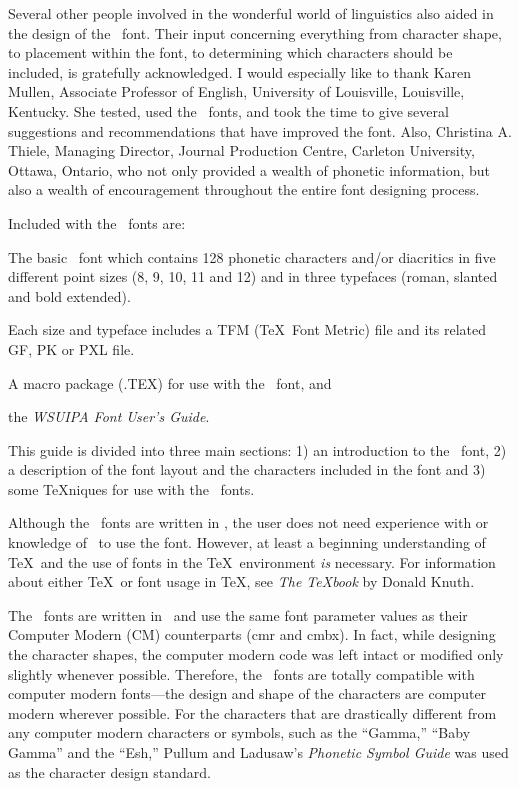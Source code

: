 Several other people involved
in the wonderful world of linguistics also aided in the design of the \wsu\
font. Their input concerning everything
from character shape, to placement within the font, to determining which
characters should be included, is gratefully acknowledged. I would especially
like to thank Karen Mullen, Associate Professor of English, University of
Louisville, Louisville, Kentucky.  She tested, used the \wsu\ fonts, and took
the time to give several suggestions and recommendations that have improved
the font. Also, Christina A. Thiele, Managing Director, Journal Production
 Centre,
Carleton University, Ottawa, Ontario, who not only provided a wealth
of phonetic information, but also a wealth of encouragement throughout
the entire font designing process.
 
 
Included with the \wsu\ fonts are:
 
\listbegin
{}
The basic \wsu\ font which contains 128 phonetic characters
and/or diacritics in five different point sizes (8,
9, 10, 11 and 12) and in
three typefaces (roman, slanted and bold extended).
 
 Each size and typeface includes a TFM (\TeX\ Font Metric)
file and its related GF, PK or PXL file.
 
 A macro package (\ipam.TEX) for use with the \wsu\ font, and
 
 the {\it WSUIPA Font User's Guide}.
\listend
 
This guide is divided into three main sections: 1) an introduction to the \wsu\
font,
2) a description of the font layout and the characters included in the font
and 3) some \TeX niques for use with the \wsu\  fonts.
 
Although the \wsu\ fonts are written in \meta , the user does not need
experience with or knowledge of \meta\ to use the font. However, at least a
beginning understanding of \TeX\ and the use of fonts in the \TeX\ environment
{\it is} necessary. For information about either \TeX\ or font usage in \TeX ,
see {\it The \TeX book} by Donald Knuth.
 
 
The \wsu\  fonts are written in \meta\ and use the same font parameter values
as their Computer Modern (CM) counterparts (cmr and cmbx). In fact, while
designing the character shapes, the computer modern code was left intact or
modified only slightly whenever possible. Therefore, the \wsu\  fonts
are totally compatible with computer modern fonts---the design and shape
of the characters are computer modern wherever possible. For the characters
that are drastically different from any computer modern characters or symbols,
such as the ``Gamma,'' ``Baby Gamma'' and the ``Esh,'' Pullum and Ladusaw's
{\it Phonetic Symbol Guide} was used as the character design
standard.
 
